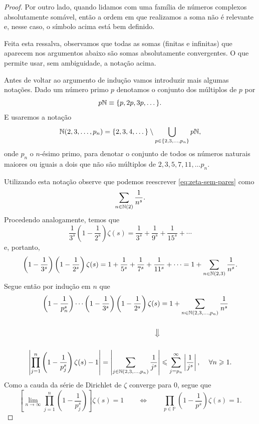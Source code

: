 \begin{proof}
    
        Por outro lado, quando lidamos com uma família de números complexos absolutamente somável, então a ordem
        em que realizamos a soma não é relevante e, 
        nesse caso, o símbolo acima está bem definido.
        
        
        Feita esta ressalva, observamos que todas as somas (finitas e infinitas) que aparecem nos argumentos abaixo 
        são somas absolutamente convergentes. 
        O que permite usar, sem ambiguidade, a notação acima.
        
        Antes de voltar ao argumento de indução vamos introduzir mais algumas notações. Dado um número primo $p$ denotamos o conjunto 
        dos múltiplos de $p$ por 
        \[
        p\mathbb{N} \equiv  \{ p, 2p, 3p, \dots \}.
        \]
        E usaremos a notação 
        \[
        \mathbb{N}(2, 3, \dots, p_n) 
        = \{ 2, 3, 4, \dots \} 
        \setminus \bigcup_{p\in\{2, 3, \dots, p_n\}} p\mathbb{N},
        \]
        onde $p_n$ o $n$-ésimo primo, para denotar o 
        conjunto de todos os números naturais maiores ou iguais a dois
        que não são múltiplos de $2,3,5,7,11,\ldots p_n$. 
        
        Utilizando esta notação observe que podemos reescrever \eqref{eq:zeta-sem-pares} como 
        \[
        \sum_{n\in\mathbb{N}(2)} \frac{1}{n^s}.
        \]
        Procedendo analogamente, temos que
        \[
        \frac{1}{3^s}\left( 1 - \frac{1}{2^s} \right)\zeta(s)
        = \frac{1}{3^s} + \frac{1}{9^s} + \frac{1}{15^s} + \cdots
        \]
        e, portanto,
        \[
        \left(1 - \frac{1}{3^s}\right)\left(1 - \frac{1}{2^s}\right)\zeta(s)
        = 1 + \frac{1}{5^s} + \frac{1}{7^s} + \frac{1}{11^s} + \cdots
        = 1 + \sum_{n\in\mathbb{N}(2,3)} \frac{1}{n^s}.
        \]
        Segue então por indução em $n$ que
        \begin{align*}
            \left(1 - \frac{1}{p_n^s}\right)
            \cdots
            \left(1 - \frac{1}{3^s}\right)
            \left(1 - \frac{1}{2^s}\right)\zeta(s)
            &= 1 + \sum_{n\in\mathbb{N}(2,3, \dots, p_n)} \frac{1}{n^s} 
            \\[0.5cm]
            \big\Downarrow
            \\[0.5cm]
            \left|
            \prod_{j=1}^n \left(1 - \frac{1}{p_j^s}\right)\zeta(s) - 1
            \right|
            = \left|
            \sum_{j\in\mathbb{N}(2,3, \dots, p_n)} \frac{1}{j^s}
            \right|
            &\leqslant \sum_{j=p_n}^{\infty} \left|\frac{1}{j^s}\right|,
            \,\quad \forall n\geqslant 1.
        \end{align*}
        Como a cauda da série de Dirichlet 
        de $\zeta$ converge para $0$,
        segue que
        \[
        \left[
        \lim_{n\to\infty} \prod_{j=1}^n \left(1 - \frac{1}{p_j^s}\right)
        \right]\zeta(s)
        = 1
        \qquad \iff \qquad
        \prod_{p\in\mathbb{P}} \left(1 - \frac{1}{p^s}\right)\zeta(s)
        = 1.
        \]
        

\end{proof}
